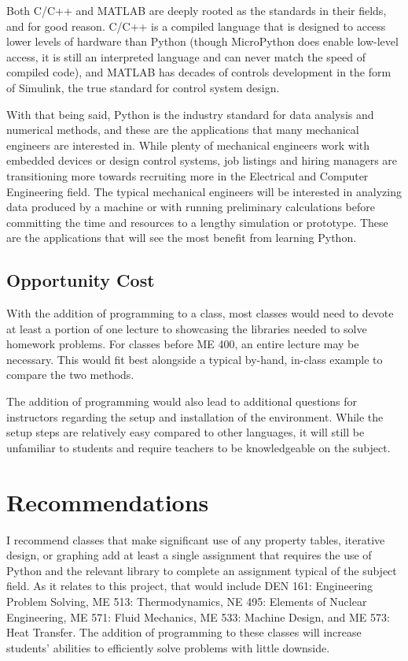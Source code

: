 Both C/C++ and MATLAB are deeply rooted as the standards in their fields,
and for good reason. C/C++ is a compiled language that is designed
to access lower levels of hardware than Python (though MicroPython does
enable low-level access, it is still an interpreted language and can
never match the speed of compiled code), and MATLAB has decades of controls
development in the form of Simulink, the true standard for control system 
design.

With that being said, Python is the industry standard for data analysis 
and numerical methods, and these are the applications that many mechanical
engineers are interested in. While plenty of mechanical engineers work 
with embedded devices or design control systems, job listings and hiring managers are
transitioning more towards recruiting more in the Electrical and Computer Engineering field.
The typical mechanical engineers will be interested in analyzing data produced 
by a machine or with running preliminary calculations before committing
the time and resources to a lengthy simulation or prototype. These are 
the applications that will see the most benefit from learning Python.

\subsection{Opportunity Cost}

With the addition of programming to a class, most classes would need to devote
at least a portion of one lecture to showcasing the libraries needed to 
solve homework problems. For classes before ME 400, an entire lecture may
be necessary. This would fit best alongside a typical by-hand, in-class
example to compare the two methods.

The addition of programming would also lead to additional questions for
instructors regarding the setup and installation of the environment. While
the setup steps are relatively easy compared to other languages, it will
still be unfamiliar to students and require teachers to be knowledgeable
on the subject.

\section{Recommendations}

I recommend classes that make significant use of any property tables, 
iterative design, or graphing add at least a single assignment that 
requires the use of Python and the relevant library to complete an assignment
typical of the subject field. As it relates to this project, that would include
DEN 161: Engineering Problem Solving, ME 513: Thermodynamics, NE 495: Elements 
of Nuclear Engineering, ME 571: Fluid Mechanics, ME 533: Machine Design, and 
ME 573: Heat Transfer. The addition of programming to these classes will 
increase students' abilities to efficiently solve problems with little downside. 

